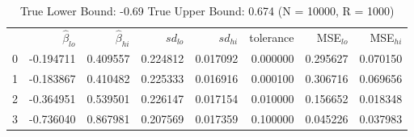 \begin{table}
\caption{True Lower Bound: -0.69 True Upper Bound: 0.674 (N = 10000, R = 1000)}
\begin{tabular}{lrrrrrrr}
 & $\hat{\beta}_{lo}$ & $\hat{\beta}_{hi}$ & $sd_{lo}$ & $sd_{hi}$ & tolerance & MSE$_{lo}$ & MSE$_{hi}$ \\
0 & -0.194711 & 0.409557 & 0.224812 & 0.017092 & 0.000000 & 0.295627 & 0.070150 \\
1 & -0.183867 & 0.410482 & 0.225333 & 0.016916 & 0.000100 & 0.306716 & 0.069656 \\
2 & -0.364951 & 0.539501 & 0.226147 & 0.017154 & 0.010000 & 0.156652 & 0.018348 \\
3 & -0.736040 & 0.867981 & 0.207569 & 0.017359 & 0.100000 & 0.045226 & 0.037983 \\
\end{tabular}
\end{table}
